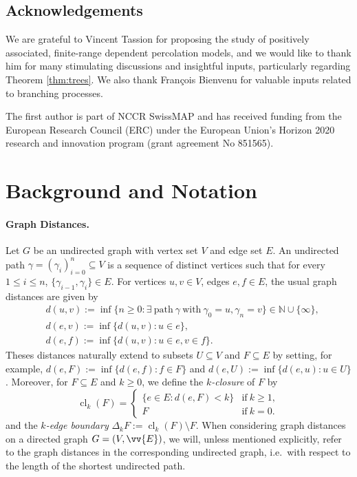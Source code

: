 \documentclass[11pt]{article}
\DeclareMathOperator{\cl}{cl}
\theoremstyle{remark}
\begin{document}
\subsection*{Acknowledgements}
We are grateful to Vincent Tassion for proposing the study of positively associated, finite-range dependent percolation models, and we  would like to thank him for many stimulating discussions and insightful inputs, particularly regarding Theorem \ref{thm:trees}. We also thank François Bienvenu for valuable inputs related to branching processes.

The first author is part of NCCR SwissMAP and  has received funding from the European Research Council (ERC) under the European Union’s Horizon 2020 research and innovation program (grant agreement No 851565).

\section{Background and Notation}
\label{sec:background-and-notation}

\paragraph{Graph Distances.} Let $G$ be an undirected graph with vertex set $V$ and edge set $E$. An undirected path $\gamma=(\gamma_i)_{i=0}^n \subseteq V$ is a sequence of distinct vertices such that for every $1\le i \le n$, $\{\gamma_{i-1},\gamma_i\} \in E$. For vertices $u,v \in V$, edges $e,f \in E$, the usual graph distances are given by 
\begin{align*}
	&d(u,v):=\inf\{n \ge 0 : \exists \ \text{path}\ \gamma \ \text{with} \ \gamma_0 = u, \gamma_n =v \} \in \mathbb N \cup \{\infty\}, \\
	&d(e,v):=\inf\{d(u,v) : u \in e\},  \\
	& d(e,f):=\inf\{d(u,v) : u \in e, v \in f \}.  
\end{align*}
Theses distances naturally extend to subsets $U \subseteq V$ and $F \subseteq E$ by setting, for example, $d(e,F):= \inf\{d(e,f):f \in F\}$ and $d(e,U):= \inf\{d(e,u):u \in U\}$.
Moreover, for $F \subseteq E$ and $k\ge 0$, we define the \emph{$k$-closure} of $F$ by
\begin{equation}
	\cl_k(F) = \begin{cases}
		\{e \in E : d(e,F) < k\} &\text{if}\ k \ge 1,\\
		F &\text{if}\ k=0.
	\end{cases}
\end{equation}
and the \emph{$k$-edge boundary} $\Delta_k F := \cl_k(F) \setminus F$.
When considering graph distances on a directed graph $G=(V,\vv{E})$, we will, unless mentioned explicitly, refer to the graph distances in the corresponding undirected graph, i.e.\ with respect to the length of the shortest undirected path.
\end{document}
